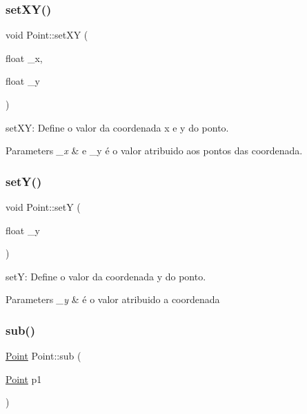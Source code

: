 \subsubsection{\texorpdfstring{set\+X\+Y()}{setXY()}}
{\footnotesize\ttfamily void Point\+::set\+XY (\begin{DoxyParamCaption}\item[{float}]{\+\_\+x,  }\item[{float}]{\+\_\+y }\end{DoxyParamCaption})}



set\+XY\+: Define o valor da coordenada x e y do ponto. 


\begin{DoxyParams}{Parameters}
{\em \+\_\+x} & e \+\_\+y é o valor atribuido aos pontos das coordenada. \\
\hline
\end{DoxyParams}
\mbox{\label{class_point_a9868c4601b0ea0c2d0de20fe41ee0e49}} 
\subsubsection{\texorpdfstring{set\+Y()}{setY()}}
{\footnotesize\ttfamily void Point\+::setY (\begin{DoxyParamCaption}\item[{float}]{\+\_\+y }\end{DoxyParamCaption})}



setY\+: Define o valor da coordenada y do ponto. 


\begin{DoxyParams}{Parameters}
{\em \+\_\+y} & é o valor atribuido a coordenada \\
\hline
\end{DoxyParams}
\mbox{\label{class_point_a9cf2c53b0a4e6282a6712824bb4e9b00}} 
\subsubsection{\texorpdfstring{sub()}{sub()}}
{\footnotesize\ttfamily \mbox{\hyperlink{class_point}{Point}} Point\+::sub (\begin{DoxyParamCaption}\item[{\mbox{\hyperlink{class_point}{Point}}}]{p1 }\end{DoxyParamCaption})}



